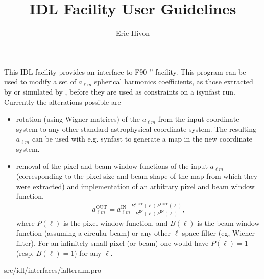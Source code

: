 
\sloppy

\title{\healpix IDL Facility User Guidelines}
 \section[ialteralm]{ }
\label{idl:ialteralm}
\author{Eric Hivon}

\begin{facility}
{This IDL facility provides an interface to F90 '' facility. 
This program can be used to modify a set of $a_{\ell m}$ spherical harmonics
  coefficients, as those extracted by  or 
  simulated by , before
  they are used as constraints on a isynfast run. Currently the alterations
  possible are %
\begin{itemize}
    \item rotation (using Wigner matrices) of the $a_{\ell m}$ from the input
    coordinate system to any other standard astrophysical coordinate system. The
    resulting $a_{\ell m}$ can be used with e.g. synfast to generate a map in the
    new coordinate system.
    \item removal of the pixel and beam window functions of the input
  $a_{\ell m}$ (corresponding to the pixel size and beam shape of the map from which
  they were extracted) and implementation of an arbitrary pixel and beam window
  function. 
 \begin{eqnarray}
 a_{\ell m}^\mathrm{OUT} = a_{\ell m}^\mathrm{IN} 
 \frac{B^\mathrm{OUT}(\ell) P^\mathrm{OUT}(\ell)}{B^\mathrm{IN}(\ell) 
 P^\mathrm{IN}(\ell)}, \label{eq:alteralm} 
\end{eqnarray}
where $P(\ell)$ is the pixel window function, and $B(\ell)$ is the beam window
 function (assuming a circular beam) or any other $\ell$ space filter (eg,
 Wiener filter). For an infinitely small pixel (or beam) one would have $P(\ell) =
 1$ (resp. $B(\ell) = 1$) for any $\ell$.
\end{itemize}
}
{src/idl/interfaces/ialteralm.pro}
\end{facility}

